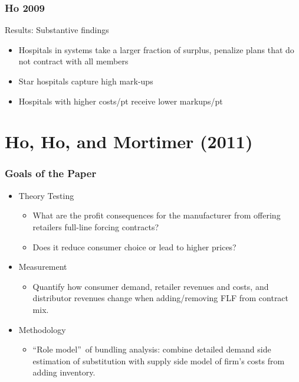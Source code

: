 \begin{frame}
\frametitle{Ho 2009}

Results: Substantive findings
\begin{itemize}
\item Hospitals in systems take a larger fraction of surplus, penalize plans that do not contract with all members
\item Star hospitals capture high mark-ups
\item Hospitals with higher costs/pt receive lower markups/pt
\end{itemize}
\end{frame}


\section{Ho, Ho, and Mortimer (2011)}


\begin{frame}
\frametitle{Goals of the Paper}

\begin{itemize}
\item Theory Testing

\begin{itemize}
\item What are the profit consequences for the manufacturer from offering
retailers full-line forcing contracts?

\item Does it reduce consumer choice or lead to higher prices?
\end{itemize}

\item Measurement

\begin{itemize}
\item Quantify how consumer demand, retailer revenues and costs, and
distributor revenues change when adding/removing FLF from contract mix.
\end{itemize}

\item Methodology

\begin{itemize}

\item \textquotedblleft Role model\textquotedblright \ of bundling analysis:
combine detailed demand side estimation of substitution with supply side
model of firm's costs from adding inventory.
\end{itemize}
\end{itemize}
\end{frame}

